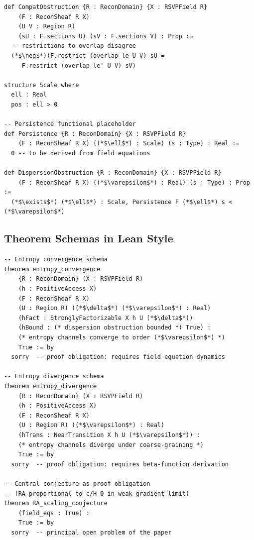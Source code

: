 \documentclass[11pt, a4paper]{article}
\theoremstyle{plain}
\theoremstyle{definition}
\theoremstyle{remark}
\begin{document}
\begin{lstlisting}[caption={Compatibility and dispersion obstruction in Lean}]
def CompatObstruction {R : ReconDomain} {X : RSVPField R}
    (F : ReconSheaf R X)
    (U V : Region R)
    (sU : F.sections U) (sV : F.sections V) : Prop :=
  -- restrictions to overlap disagree
  (*$\neg$*)(F.restrict (overlap_le U V) sU =
     F.restrict (overlap_le' U V) sV)

structure Scale where
  ell : Real
  pos : ell > 0

-- Persistence functional placeholder
def Persistence {R : ReconDomain} {X : RSVPField R}
    (F : ReconSheaf R X) ((*$\ell$*) : Scale) (s : Type) : Real :=
  0 -- to be derived from field equations

def DispersionObstruction {R : ReconDomain} {X : RSVPField R}
    (F : ReconSheaf R X) ((*$\varepsilon$*) : Real) (s : Type) : Prop :=
  (*$\exists$*) (*$\ell$*) : Scale, Persistence F (*$\ell$*) s < (*$\varepsilon$*)
\end{lstlisting}

\subsection{Theorem Schemas in Lean Style}

\begin{lstlisting}[caption={Central theorem schemas as Lean proof obligations}]
-- Entropy convergence schema
theorem entropy_convergence
    {R : ReconDomain} (X : RSVPField R)
    (h : PositiveAccess X)
    (F : ReconSheaf R X)
    (U : Region R) ((*$\delta$*) (*$\varepsilon$*) : Real)
    (hFact : StronglyFactorizable X h U (*$\delta$*))
    (hBound : (* dispersion obstruction bounded *) True) :
    (* entropy channels converge to order (*$\varepsilon$*) *)
    True := by
  sorry  -- proof obligation: requires field equation dynamics

-- Entropy divergence schema
theorem entropy_divergence
    {R : ReconDomain} (X : RSVPField R)
    (h : PositiveAccess X)
    (F : ReconSheaf R X)
    (U : Region R) ((*$\varepsilon$*) : Real)
    (hTrans : NearTransition X h U (*$\varepsilon$*)) :
    (* entropy channels diverge under coarse-graining *)
    True := by
  sorry  -- proof obligation: requires beta-function derivation

-- Central conjecture as proof obligation
-- (RA proportional to c/H_0 in weak-gradient limit)
theorem RA_scaling_conjecture
    (field_eqs : True) :
    True := by
  sorry  -- principal open problem of the paper
\end{lstlisting}
\end{document}
